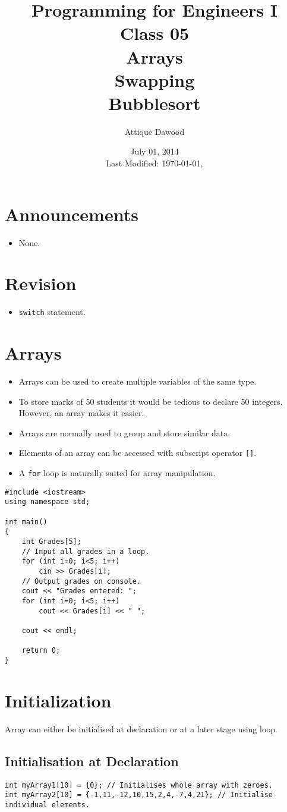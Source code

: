 \documentclass[12pt,a4paper]{article}
\title{Programming for Engineers I\\Class 05\\Arrays\\Swapping\\Bubblesort}
\author{Attique Dawood}
\date{July 01, 2014\\[0.2cm] Last Modified: \today, \currenttime}
\begin{document}
\maketitle
\section{Announcements}
\begin{itemize}
\item None.
\end{itemize}
\section{Revision}
\begin{itemize}
\item \verb|switch| statement.
\end{itemize}
\section{Arrays}
\begin{itemize}
\item Arrays can be used to create multiple variables of the same type.
\item To store marks of 50 students it would be tedious to declare 50 integers. However, an array makes it easier.
\item Arrays are normally used to group and store similar data.
\item Elements of an array can be accessed with subscript operator \verb|[]|.
\item A \verb|for| loop is naturally suited for array manipulation.
\end{itemize}
\begin{lstlisting}[caption={A Simple Array}]
#include <iostream>
using namespace std;

int main()
{
	int Grades[5];
	// Input all grades in a loop.
	for (int i=0; i<5; i++)
		cin >> Grades[i];
	// Output grades on console.
	cout << "Grades entered: ";
	for (int i=0; i<5; i++)
		cout << Grades[i] << " ";

	cout << endl;

	return 0;
}
\end{lstlisting}
\section{Initialization}
Array can either be initialised at declaration or at a later stage using loop.
\subsection{Initialisation at Declaration}
\begin{lstlisting}[caption={Array initialisation at declaration}]
int myArray1[10] = {0}; // Initialises whole array with zeroes.
int myArray2[10] = {-1,11,-12,10,15,2,4,-7,4,21}; // Initialise individual elements.
\end{lstlisting}
\end{document}
